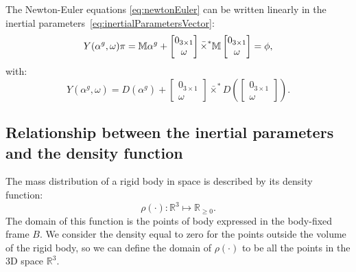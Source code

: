 \begin{proposition}
The Newton-Euler equations \eqref{eq:newtonEuler} can be written linearly \citep{garofalo2013closed,handbookident} in the inertial parameters~\eqref{eq:inertialParametersVector}:
\begin{equation}
\label{eq:inertialRegressor}
Y(\alpha^g, \omega) \pi 
=
\mathbb{M} \alpha^g + 
\begin{bmatrix} 0_{3 \times 1} \\ \omega \end{bmatrix}
\bar{\times}^* \mathbb{M} 
\begin{bmatrix} 0_{3 \times 1} \\ \omega \end{bmatrix}
= \phi, 
\end{equation}
with:
\begin{equation}
  Y(\alpha^g,\omega) =  D \left(\alpha^g \right) + \begin{bmatrix} 0_{3 \times 1} \\ \omega \end{bmatrix}
\bar{\times}^* D\left( \begin{bmatrix} 0_{3 \times 1} \\ \omega \end{bmatrix} \right) .
\end{equation}
\end{proposition}

\subsection{Relationship between the inertial parameters and the density function}
The mass distribution of a rigid body in space is described by its density function:
\begin{equation}
\rho(\cdot): \mathbb{R}^3 \mapsto \mathbb{R}_{\ge 0} .
\end{equation}
The domain of this function is the points of body expressed in the body-fixed frame $B$.
We consider the density equal to zero for the points outside the volume of the rigid body, so we can define the domain of $\rho(\cdot)$ to be all the points in the 3D space $\mathbb{R}^3$.

